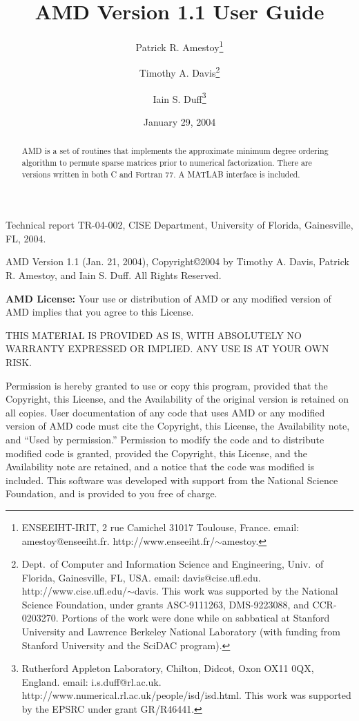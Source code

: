 \documentclass[11pt]{article}
\begin{document}

\title{AMD Version 1.1 User Guide}
\author{Patrick R. Amestoy\thanks{ENSEEIHT-IRIT,
2 rue Camichel 31017 Toulouse, France.
email: amestoy@enseeiht.fr.  http://www.enseeiht.fr/$\sim$amestoy.}
\and Timothy A. Davis\thanks{
Dept.~of Computer and Information Science and Engineering,
Univ.~of Florida, Gainesville, FL, USA.
email: davis@cise.ufl.edu.
http://www.cise.ufl.edu/$\sim$davis.
This work was supported by the National
Science Foundation, under grants ASC-9111263, DMS-9223088, and CCR-0203270.
Portions of the work were done while on sabbatical at Stanford University
and Lawrence Berkeley National Laboratory (with funding from Stanford
University and the SciDAC program).
}
\and Iain S. Duff\thanks{Rutherford Appleton Laboratory, Chilton, Didcot, 
Oxon OX11 0QX, England. email: i.s.duff@rl.ac.uk.  
http://www.numerical.rl.ac.uk/people/isd/isd.html.
This work was supported by the EPSRC under grant GR/R46441.
}}

\date{January 29, 2004}
\maketitle

\begin{abstract}
AMD is a set of routines that implements the approximate minimum degree ordering
algorithm to permute sparse matrices prior to
numerical factorization.
There are versions written in both C and Fortran 77.
A MATLAB interface is included.
\end{abstract}

Technical report TR-04-002, CISE Department, University of Florida,
Gainesville, FL, 2004.

AMD Version 1.1 (Jan. 21, 2004), Copyright\copyright 2004 by Timothy A.
Davis, Patrick R. Amestoy, and Iain S. Duff.  All Rights Reserved.

{\bf AMD License:}
    Your use or distribution of AMD or any modified version of
    AMD implies that you agree to this License.

    THIS MATERIAL IS PROVIDED AS IS, WITH ABSOLUTELY NO WARRANTY
    EXPRESSED OR IMPLIED.  ANY USE IS AT YOUR OWN RISK.

    Permission is hereby granted to use or copy this program, provided
    that the Copyright, this License, and the Availability of the original
    version is retained on all copies.  User documentation of any code that
    uses AMD or any modified version of AMD code must cite the
    Copyright, this License, the Availability note, and ``Used by permission.''
    Permission to modify the code and to distribute modified code is granted,
    provided the Copyright, this License, and the Availability note are
    retained, and a notice that the code was modified is included.  This
    software was developed with support from the National Science Foundation,
    and is provided to you free of charge.
\end{document}
